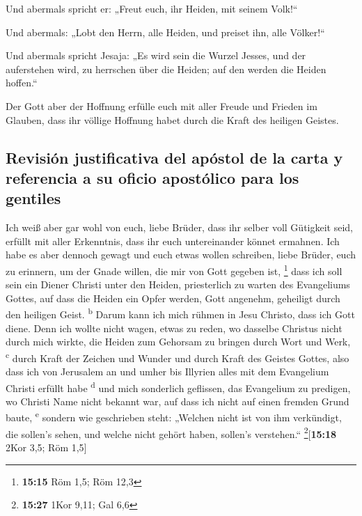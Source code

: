  Und abermals spricht er: „Freut euch, ihr Heiden, mit
seinem Volk!{}``

 Und abermals: „Lobt den Herrn, alle Heiden, und preiset
ihn, alle Völker!{}``

 Und abermals spricht Jesaja: „Es wird sein die Wurzel
Jesses, und der auferstehen wird, zu herrschen über die Heiden; auf den
werden die Heiden hoffen.``

 Der Gott aber der Hoffnung erfülle euch mit aller Freude
und Frieden im Glauben, dass ihr völlige Hoffnung habet durch die Kraft
des heiligen Geistes.

\hypertarget{revisiuxf3n-justificativa-del-apuxf3stol-de-la-carta-y-referencia-a-su-oficio-apostuxf3lico-para-los-gentiles}{%
\subsection{Revisión justificativa del apóstol de la carta y referencia
a su oficio apostólico para los
gentiles}\label{revisiuxf3n-justificativa-del-apuxf3stol-de-la-carta-y-referencia-a-su-oficio-apostuxf3lico-para-los-gentiles}}

 Ich weiß aber gar wohl von euch, liebe Brüder, dass ihr
selber voll Gütigkeit seid, erfüllt mit aller Erkenntnis, dass ihr euch
untereinander könnet ermahnen.  Ich habe es aber dennoch
gewagt und euch etwas wollen schreiben, liebe Brüder, euch zu erinnern,
um der Gnade willen, die mir von Gott gegeben ist, \footnote{\textbf{15:15}
  Röm 1,5; Röm 12,3}  dass ich soll sein ein Diener
Christi unter den Heiden, priesterlich zu warten des Evangeliums Gottes,
auf dass die Heiden ein Opfer werden, Gott angenehm, geheiligt durch den
heiligen Geist. \textsuperscript{b}  Darum kann ich mich
rühmen in Jesu Christo, dass ich Gott diene.  Denn ich
wollte nicht wagen, etwas zu reden, wo dasselbe Christus nicht durch
mich wirkte, die Heiden zum Gehorsam zu bringen durch Wort und Werk,
\textsuperscript{c}  durch Kraft der Zeichen und Wunder
und durch Kraft des Geistes Gottes, also dass ich von Jerusalem an und
umher bis Illyrien alles mit dem Evangelium Christi erfüllt habe
\textsuperscript{d}  und mich sonderlich geflissen, das
Evangelium zu predigen, wo Christi Name nicht bekannt war, auf dass ich
nicht auf einen fremden Grund baute, \textsuperscript{e} 
sondern wie geschrieben steht: „Welchen nicht ist von ihm verkündigt,
die sollen's sehen, und welche nicht gehört haben, sollen's verstehen.``
\footnote{\textbf{15:27} 1Kor 9,11; Gal 6,6}{[}\textbf{15:18} 2Kor 3,5;
Röm 1,5{]}

